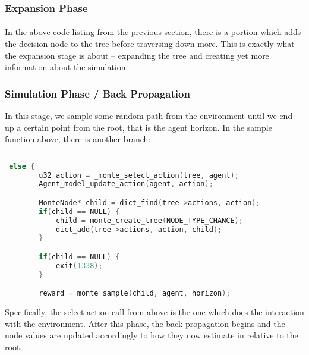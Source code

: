\documentclass[fancychapters]{report}   	%
\begin{document}
\paragraph{}

\subsubsection{Expansion Phase}

\paragraph{}
    In the above code listing from the previous section, there is a portion which adds the decision node to the tree before traversing down more. This is exactly what the expansion stage is about -- expanding the tree and creating yet more information about the simulation. 
\paragraph{}

\subsubsection{Simulation Phase / Back Propagation}
 In this stage, we sample some random path from the environment until we end up a certain point from the root, that is the agent horizon. In the sample function above, there is another branch:
 
 \begin{lstlisting}[language=C, caption="Simulation Phase"]
 
 else {
        u32 action = _monte_select_action(tree, agent);
        Agent_model_update_action(agent, action);

        MonteNode* child = dict_find(tree->actions, action);
        if(child == NULL) {
            child = monte_create_tree(NODE_TYPE_CHANCE);
    	    dict_add(tree->actions, action, child);
        }

        if(child == NULL) {
            exit(1338);
        }

        reward = monte_sample(child, agent, horizon);
 \end{lstlisting}

Specifically, the select action call from above is the one which does the interaction with the environment. After this phase, the back propagation begins and the node values are updated accordingly to how they now estimate in relative to the root.
\end{document}

